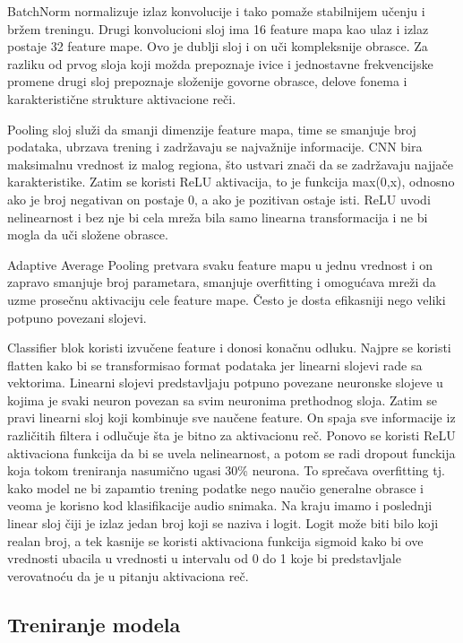 \documentclass[a4paper,12pt]{article}
\begin{document}
BatchNorm normalizuje izlaz konvolucije i tako pomaže stabilnijem učenju i bržem treningu. Drugi konvolucioni sloj ima 16 feature mapa kao ulaz i izlaz postaje 32 feature mape. Ovo je dublji sloj i on uči kompleksnije obrasce. Za razliku od prvog sloja koji možda prepoznaje ivice i jednostavne frekvencijske promene drugi sloj prepoznaje složenije govorne obrasce, delove fonema i karakteristične strukture aktivacione reči. 

Pooling sloj služi da smanji dimenzije feature mapa, time se smanjuje broj podataka, ubrzava trening i zadržavaju se najvažnije informacije. CNN bira maksimalnu vrednost iz malog regiona, što ustvari znači da se zadržavaju najjače karakteristike. Zatim se koristi ReLU aktivacija, to je funkcija max(0,x), odnosno ako je broj negativan on postaje 0, a ako je pozitivan ostaje isti. ReLU uvodi nelinearnost i bez nje bi cela mreža bila samo linearna transformacija i ne bi mogla da uči složene obrasce.

Adaptive Average Pooling pretvara svaku feature mapu u jednu vrednost i on zapravo smanjuje broj parametara, smanjuje overfitting i omogućava mreži da uzme prosečnu aktivaciju cele feature mape. Često je dosta efikasniji nego veliki potpuno povezani slojevi.

Classifier blok koristi izvučene feature i donosi konačnu odluku. Najpre se koristi flatten kako bi se transformisao format podataka jer linearni slojevi rade sa vektorima. Linearni slojevi predstavljaju potpuno povezane neuronske slojeve u kojima je svaki neuron povezan sa svim neuronima prethodnog sloja. Zatim se pravi linearni sloj koji kombinuje sve naučene feature. On spaja sve informacije iz različitih filtera i odlučuje šta je bitno za aktivacionu reč. Ponovo se koristi ReLU aktivaciona funkcija da bi se uvela nelinearnost, a potom se radi dropout funckija koja tokom treniranja nasumično ugasi 30\%
neurona. To sprečava overfitting tj. kako model ne bi zapamtio trening podatke nego naučio generalne obrasce i veoma je korisno kod klasifikacije audio snimaka. Na kraju imamo i poslednji linear sloj čiji je izlaz jedan broj koji se naziva i logit. Logit može biti bilo koji realan broj, a tek kasnije se koristi aktivaciona funkcija sigmoid kako bi ove vrednosti ubacila u vrednosti u intervalu od 0 do 1 koje bi predstavljale verovatnoću da je u pitanju aktivaciona reč.


\subsection{Treniranje modela}
\end{document}
